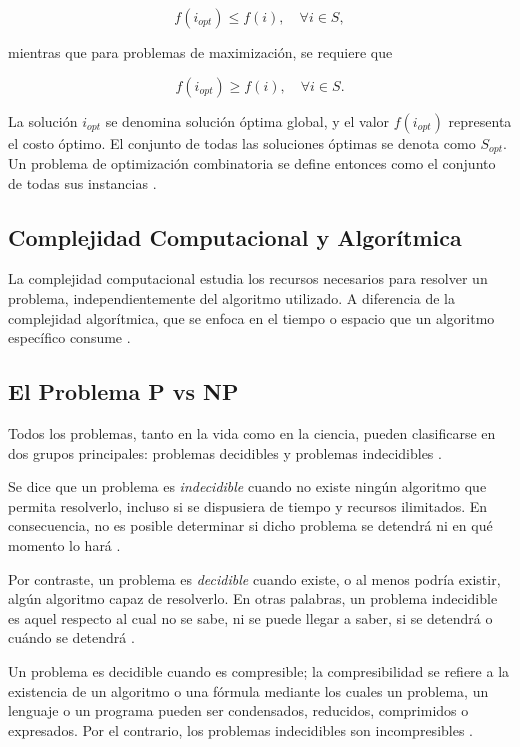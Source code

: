 \documentclass[12pt,titlepage,twoside,openright]{book}
\begin{document}
\[
	f(i_{opt}) \leq f(i), \quad \forall i \in S,
\]

mientras que para problemas de maximización, se requiere que

\[
	f(i_{opt}) \geq f(i), \quad \forall i \in S.
\]

La solución \(i_{opt}\) se denomina solución óptima global, y el valor \(f(i_{opt})\) representa el costo óptimo. El conjunto de todas las soluciones óptimas se denota como \(S_{opt}\). Un problema de optimización combinatoria se define entonces como el conjunto de todas sus instancias \citep{cobos2010}.



\subsection{Complejidad Computacional y Algorítmica}

La complejidad computacional estudia los recursos necesarios para resolver un problema, independientemente del algoritmo utilizado. A diferencia de la complejidad algorítmica, que se enfoca en el tiempo o espacio que un algoritmo específico consume \citep{maldonado2013problema}.

\subsection{El Problema P vs NP}

Todos los problemas, tanto en la vida como en la ciencia, pueden clasificarse en dos grupos principales: problemas decidibles y problemas indecidibles \citep{maldonado2013problema}.

Se dice que un problema es \emph{indecidible} cuando no existe ningún algoritmo que permita resolverlo, incluso si se dispusiera de tiempo y recursos ilimitados. En consecuencia, no es posible determinar si dicho problema se detendrá ni en qué momento lo hará \citep{maldonado2013problema}.

Por contraste, un problema es \emph{decidible} cuando existe, o al menos podría existir, algún algoritmo capaz de resolverlo. En otras palabras, un problema indecidible es aquel respecto al cual no se sabe, ni se puede llegar a saber, si se detendrá o cuándo se detendrá \citep{maldonado2013problema}.

Un problema es decidible cuando es compresible; la compresibilidad se refiere a la existencia de un algoritmo o una fórmula mediante los cuales un problema, un lenguaje o un programa pueden ser condensados, reducidos, comprimidos o expresados. Por el contrario, los problemas indecidibles son incompresibles \citep{maldonado2013problema}.
\end{document}
